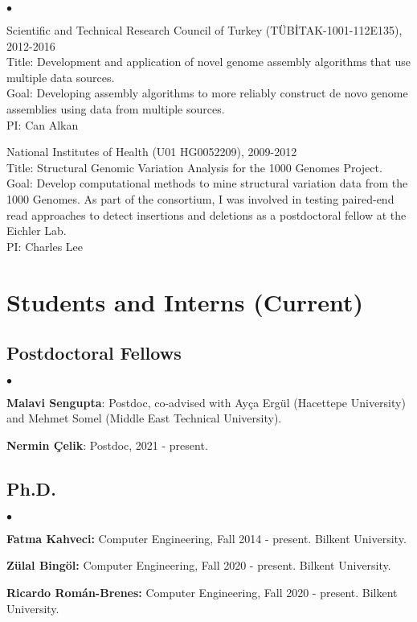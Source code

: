 \documentclass[margin,line]{res}
\newenvironment{list2}{
  \begin{list}{$\bullet$}{%
      \setlength{\itemsep}{0.1cm}
      \setlength{\parsep}{0in} \setlength{\parskip}{0in}
      \setlength{\topsep}{0in} \setlength{\partopsep}{0in} 
      \setlength{\leftmargin}{0.2in}}}{\end{list}}
\begin{document}
\begin{resume}
\begin{list2}
                                       \item
                                         Scientific and Technical Research Council of Turkey (T\"{U}B\.{I}TAK-1001-112E135), 2012-2016\\
                                         Title: Development and application of novel genome assembly algorithms that use multiple data sources.\\
                                         Goal: Developing assembly algorithms to more reliably construct de novo genome assemblies using data from multiple sources.\\
                                         PI: Can Alkan
                                       \item
                                         National Institutes of Health (U01 HG0052209), 2009-2012\\
                                         Title: Structural Genomic Variation Analysis for the 1000 Genomes Project.\\
                                         Goal: Develop computational methods to mine structural variation data from the 1000 Genomes.
                                         As part of the consortium, I was involved in testing paired-end read approaches to detect insertions and deletions as a postdoctoral fellow at the Eichler Lab.\\
                                         PI: Charles Lee
                                       \end{list2}


\section{\sc Students and Interns (Current)}
\vspace*{-.4cm}
\subsection{\small \sc Postdoctoral Fellows}
\begin{list2}
\item 
{\bf Malavi Sengupta}: Postdoc, co-advised with Ayça Ergül (Hacettepe University) and Mehmet Somel (Middle East Technical University).
\item 
{\bf Nermin Çelik}: Postdoc, 2021 - present.
\end{list2}
\vspace*{-.4cm}
\subsection{\small \sc Ph.D.}
\begin{list2}
\item
  {\bf Fatma Kahveci:} Computer Engineering, Fall 2014 - present.
  Bilkent University.
  \item
  {\bf Zülal Bingöl:} Computer Engineering, Fall 2020 - present. Bilkent University. 
  \item
  {\bf Ricardo Román-Brenes:} Computer Engineering, Fall 2020 - present. Bilkent University. 
\end{list2}
\vspace*{-.4cm}

\end{resume}
\end{document}
